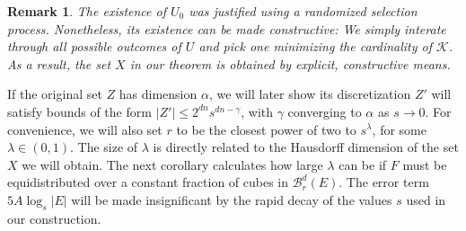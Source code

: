 \documentclass[usenames,dvipsnames]{article}
\theoremstyle{plain}
\theoremstyle{plain}
\newtheorem*{remark}{Remark}
\begin{document}
\begin{remark}
	The existence of $U_0$ was justified using a randomized selection process. Nonetheless, its existence can be made constructive: We simply interate through all possible outcomes of $U$ and pick one minimizing the cardinality of $\mathcal{K}$. As a result, the set $X$ in our theorem is obtained by explicit, constructive means.
\end{remark}

If the original set $Z$ has dimension $\alpha$, we will later show its discretization $Z'$ will satisfy bounds of the form $|Z'| \leq 2^{dn} s^{dn-\gamma}$, with $\gamma$ converging to $\alpha$ as $s \to 0$. For convenience, we will also set $r$ to be the closest power of two to $s^\lambda$, for some $\lambda \in (0,1)$. The size of $\lambda$ is directly related to the Hausdorff dimension of the set $X$ we will obtain. The next corollary calculates how large $\lambda$ can be if $F$ must be equidistributed over a constant fraction of cubes in $\mathcal{B}^d_r(E)$. The error term $5A \log_s |E|$ will be made insignificant by the rapid decay of the values $s$ used in our construction.
\end{document}
